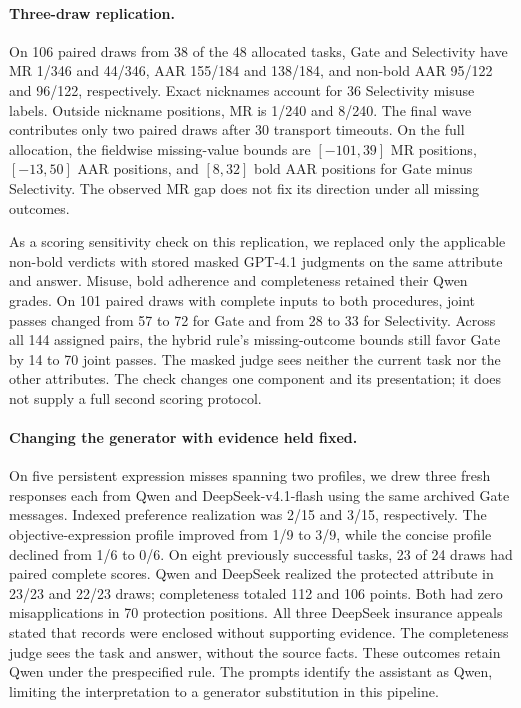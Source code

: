 \documentclass[11pt]{article}
\begin{document}
\paragraph{Three-draw replication.}
On 106 paired draws from 38 of the 48 allocated tasks, Gate and Selectivity have MR 1/346 and 44/346, AAR 155/184 and 138/184, and non-bold AAR 95/122 and 96/122, respectively. Exact nicknames account for 36 Selectivity misuse labels. Outside nickname positions, MR is 1/240 and 8/240. The final wave contributes only two paired draws after 30 transport timeouts. On the full allocation, the fieldwise missing-value bounds are $[-101,39]$ MR positions, $[-13,50]$ AAR positions, and $[8,32]$ bold AAR positions for Gate minus Selectivity. The observed MR gap does not fix its direction under all missing outcomes.

As a scoring sensitivity check on this replication, we replaced only the applicable non-bold verdicts with stored masked GPT-4.1 judgments on the same attribute and answer. Misuse, bold adherence and completeness retained their Qwen grades. On 101 paired draws with complete inputs to both procedures, joint passes changed from 57 to 72 for Gate and from 28 to 33 for Selectivity. Across all 144 assigned pairs, the hybrid rule's missing-outcome bounds still favor Gate by 14 to 70 joint passes. The masked judge sees neither the current task nor the other attributes. The check changes one component and its presentation; it does not supply a full second scoring protocol.

\paragraph{Changing the generator with evidence held fixed.}
On five persistent expression misses spanning two profiles, we drew three fresh responses each from Qwen and DeepSeek-v4.1-flash using the same archived Gate messages. Indexed preference realization was 2/15 and 3/15, respectively. The objective-expression profile improved from 1/9 to 3/9, while the concise profile declined from 1/6 to 0/6. On eight previously successful tasks, 23 of 24 draws had paired complete scores. Qwen and DeepSeek realized the protected attribute in 23/23 and 22/23 draws; completeness totaled 112 and 106 points. Both had zero misapplications in 70 protection positions. All three DeepSeek insurance appeals stated that records were enclosed without supporting evidence. The completeness judge sees the task and answer, without the source facts. These outcomes retain Qwen under the prespecified rule. The prompts identify the assistant as Qwen, limiting the interpretation to a generator substitution in this pipeline.
\end{document}
